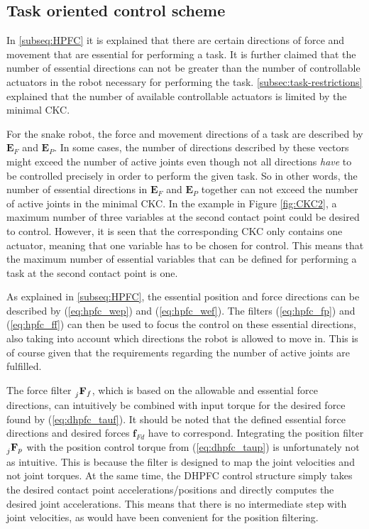 \subsection{Task oriented control scheme}\label{subsec:task-oriented}


In \ref{subseq:HPFC} it is explained that there are certain directions of force and movement that are essential for performing a task. It is further claimed that the number of essential directions can not be greater than the number of controllable actuators in the robot necessary for performing the task. \ref{subsec:task-restrictions} explained that the number of available controllable actuators is limited by the minimal CKC.

For the snake robot, the force and movement directions of a task are described by $\mathbf{E}_F$ and $\mathbf{E}_P$. In some cases, the number of directions described by these vectors might exceed the number of active joints even though not all directions \textit{have} to be controlled precisely in order to perform the given task. So in other words, the number of essential directions in $\mathbf{E}_F$ and $\mathbf{E}_P$ together can not exceed the number of active joints in the minimal CKC. In the example in Figure \ref{fig:CKC2}, a maximum number of three variables at the second contact point could be desired to control. However, it is seen that the corresponding CKC only contains one actuator, meaning that one variable has to be chosen for control. This means that the maximum number of essential variables that can be defined for performing a task at the second contact point is one.

As explained in \ref{subseq:HPFC}, the essential position and force directions can be described by (\ref{eq:hpfc_wep}) and (\ref{eq:hpfc_wef}). The filters (\ref{eq:hpfc_fp}) and (\ref{eq:hpfc_ff}) can then be used to focus the control on these essential directions, also taking into account which directions the robot is allowed to move in. This is of course given that the requirements regarding the number of active joints are fulfilled.

The force filter $\prescript{}{j}{\mathbf{F}}_{f}$, which is based on the allowable and essential force directions, can intuitively be combined with input torque for the desired force found by (\ref{eq:dhpfc_tauf}). It should be noted that the defined essential force directions and desired forces $\mathbf{f}_{Fd}$ have to correspond. Integrating the position filter $\prescript{}{j}{\mathbf{F}}_{p}$ with the position control torque from (\ref{eq:dhpfc_taup}) is unfortunately not as intuitive. This is because the filter is designed to map the joint velocities and not joint torques. At the same time, the DHPFC control structure simply takes the desired contact point accelerations/positions and directly computes the desired joint accelerations. This means that there is no intermediate step with joint velocities, as would have been convenient for the position filtering.

